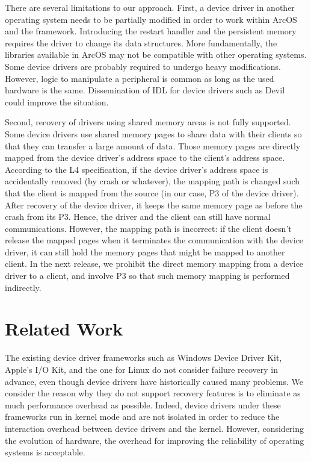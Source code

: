 \documentclass{report}
\begin{document}
There are several limitations to our approach.  First, a device driver in another operating system needs to be partially modified in order to work within ArcOS and the framework.  Introducing the restart handler and the persistent memory requires the driver to change its data structures.  More fundamentally, the libraries available in ArcOS may not be compatible with other operating systems. Some device drivers are probably required to undergo heavy modifications.  However, logic to manipulate a peripheral is common as long as the used hardware is the same.  Dissemination of IDL for device drivers such as Devil~\cite{merillon00devil} could improve the situation.

Second, recovery of drivers using shared memory areas is not fully supported.  Some device drivers use shared memory pages to share data with their clients so that they can transfer a large amount of data.  Those memory pages are directly mapped from the device driver's address space to the client's address space.  According to the L4 specification, if the device driver's address space is accidentally removed (by crash or whatever), the mapping path is changed such that the client is mapped from the source (in our case, P3 of the device driver).  After recovery of the device driver, it keeps the same memory page as before the crash from its P3.  Hence, the driver and the client can still have normal communications.  However, the mapping path is incorrect: if the client doesn't release the mapped pages when it terminates the communication with the device driver, it can still hold the memory pages that might be mapped to another client.  In the next release, we prohibit the direct memory mapping from a device driver to a client, and involve P3 so that such memory mapping is performed indirectly.

\section{Related Work}
\label{s:rel}

The existing device driver frameworks such as Windows Device Driver Kit\cite{wdm}, Apple's I/O Kit\cite{iokit}, and the one for Linux\cite{linuxdd} do not consider failure recovery in advance, even though device drivers have historically caused many problems.  We consider the reason why they do not support recovery features is to eliminate as much performance overhead as possible.  Indeed, device drivers under these frameworks run in kernel mode and are not isolated in order to reduce the interaction overhead between device drivers and the kernel.  However, considering the evolution of hardware, the overhead for improving the reliability of operating systems is acceptable.
\end{document}
